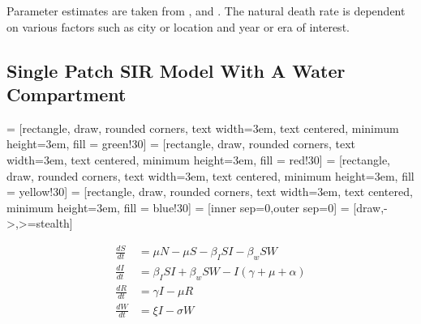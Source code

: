 \documentclass[12pt]{article}\usepackage[]{graphicx}\usepackage[]{color}
\begin{document}
Parameter estimates are taken from \cite{link5}, \cite{link8} and \cite{link3}.
The natural death rate is dependent on various factors such as city or location and year or era of interest.

\subsection{Single Patch SIR Model With A Water Compartment}

 = [rectangle, draw, rounded corners, text width=3em, text centered, minimum height=3em, fill = green!30]
 = [rectangle, draw, rounded corners, text width=3em, text centered, minimum height=3em, fill = red!30]
 = [rectangle, draw, rounded corners, text width=3em, text centered, minimum height=3em, fill = yellow!30]
 = [rectangle, draw, rounded corners, text width=3em, text centered, minimum height=3em, fill = blue!30]
 = [inner sep=0,outer sep=0]
 = [draw,->,>=stealth]
\begin{center}
\end{center}
\begin{align*}
    \frac{dS}{dt}&= \mu N - \mu S - \beta_I SI - \beta_w S W  \\
    \frac{dI}{dt}&= \beta_I S I + \beta_w S W - I (\gamma + \mu + \alpha) \\
    \frac{dR}{dt}&= \gamma I - \mu R \\
    \frac{dW}{dt}&= \xi I  - \sigma W
\end{align*}
\end{document}
